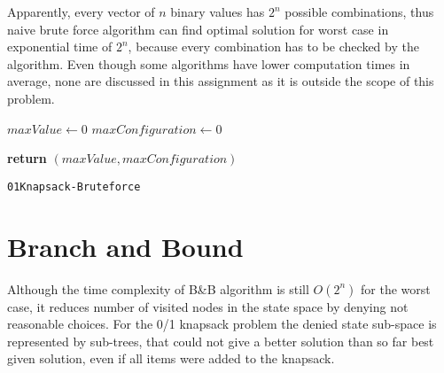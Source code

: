 \documentclass{article}
\begin{document}
		Apparently, every vector of $n$ binary values has $2^n$ possible combinations, thus naive brute force algorithm can find optimal solution for worst case in exponential time of $2^n$, because every combination has to be checked by the algorithm. Even though some algorithms have lower computation times in average, none are discussed in this assignment as it is outside the scope of this problem.

		\begin{center}
			\begin{minipage}{1\linewidth} %
				\begin{algorithm}[H]
					\hrulefill
					\medskip

					$maxValue \leftarrow 0$ \;
					$maxConfiguration \leftarrow 0$ \;

					{\bf return} $(maxValue,maxConfiguration)$ \;
					\caption{\texttt{01Knapsack-Bruteforce}} %
					\label{alg:knapsack-bruteforce}   %
				\end{algorithm}
			\end{minipage}
		\end{center}


	\clearpage
	\section{Branch and Bound}
		Although the time complexity of B\&B algorithm is still $O(2^n)$ for the worst case, it reduces number of visited nodes in the state space by denying not reasonable choices. For the 0/1 knapsack problem the denied state sub-space is represented by sub-trees, that could not give a better solution than so far best given solution, even if all items were added to the knapsack.
\end{document}
